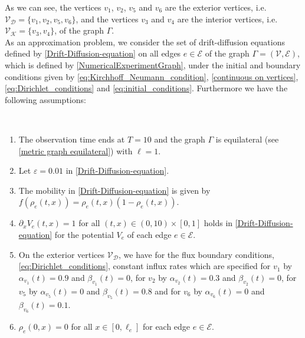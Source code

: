 As we can see, the vertices $v_1$, $v_2$, $v_5$ and $v_6$ are the exterior vertices, i.e. $\mathcal{V}_{\mathcal{D}} = \{v_1, v_2, v_5, v_6\}$, and the vertices $v_3$ and $v_4$ are the interior vertices, i.e. $\mathcal{V}_{\mathcal{K}} = \{v_3, v_4\}$, of the graph $\Gamma$. \\
As an approximation problem, we consider the set of drift-diffusion equations defined by \cref{Drift-Diffusion-equation} on all edges $e \in \mathcal{E}$ of the graph $\Gamma = (\mathcal{V}, \mathcal{E})$, which is defined by \cref{NumericalExperimentGraph}, under the initial and boundary conditions given by \cref{eq:Kirchhoff_Neumann_condition}, \cref{continuous on vertices}, \cref{eq:Dirichlet_conditions} and \cref{eq:initial_conditions}. Furthermore we have the following assumptions:
\begin{assumption} 
    \ \\[-1.5\baselineskip]
    \begin{enumerate}
        \item The observation time ends at $T = 10$ and the graph $\Gamma$ is equilateral (see \cref{metric graph equilateral}) with $\ell = 1$. 
        \item Let $\varepsilon = 0.01$ in \cref{Drift-Diffusion-equation}.
        \item The mobility in \cref{Drift-Diffusion-equation} is given by $f(\rho_e(t,x)) = \rho_e (t,x)(1-\rho_e (t,x))$.
        \item $\partial_x V_e (t,x) = 1$ for all $(t,x) \in (0, 10) \times [0,1]$ holds in \cref{Drift-Diffusion-equation} for the potential $V_e$ of each edge $e \in \mathcal{E}$. 
        \item On the exterior vertices $\mathcal{V}_{\mathcal{D}}$, we have for the flux boundary conditions, \cref{eq:Dirichlet_conditions}, constant influx rates which are specified for $v_1$ by $\alpha_{v_1}(t) = 0.9$ and $\beta_{v_1}(t) = 0$, for $v_2$ by $\alpha_{v_2}(t) = 0.3$ and $\beta_{v_2}(t) = 0$, for $v_5$ by $\alpha_{v_5}(t) = 0$ and $\beta_{v_5}(t) = 0.8$ and for $v_6$ by $\alpha_{v_6}(t) = 0$ and $\beta_{v_6}(t) = 0.1$.
        \item $\rho_e(0,x) = 0$ for all $x \in [0, \ell_e]$ for each edge $e \in \mathcal{E}$. 
    \end{enumerate}
\end{assumption}
